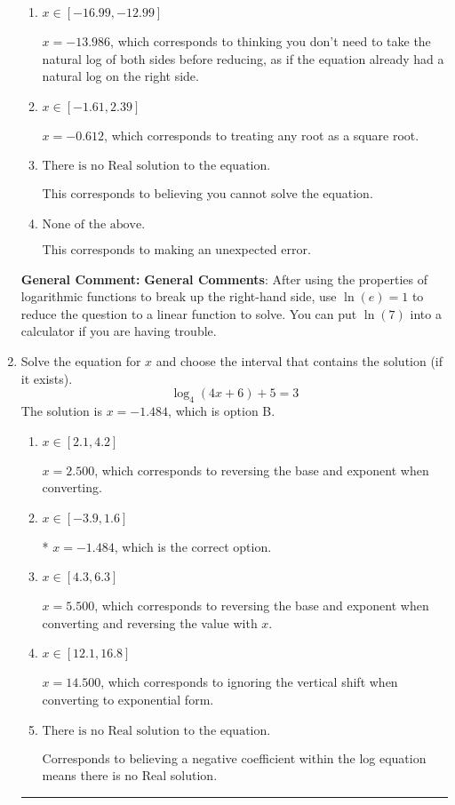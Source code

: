 \documentclass{extbook}[14pt]
\newcommand{\litem}[1]{\item #1

\rule{\textwidth}{0.4pt}}
\begin{document}
\begin{enumerate}
{\begin{enumerate}[label=\Alph*.]
* $x = -2.809$, which is the correct option.
\item \( x \in [-16.99, -12.99] \)

$x = -13.986$, which corresponds to thinking you don't need to take the natural log of both sides before reducing, as if the equation already had a natural log on the right side.
\item \( x \in [-1.61, 2.39] \)

$x = -0.612$, which corresponds to treating any root as a square root.
\item \( \text{There is no Real solution to the equation.} \)

This corresponds to believing you cannot solve the equation.
\item \( \text{None of the above.} \)

This corresponds to making an unexpected error.
\end{enumerate}

\textbf{General Comment:} \textbf{General Comments}: After using the properties of logarithmic functions to break up the right-hand side, use $\ln(e) = 1$ to reduce the question to a linear function to solve. You can put $\ln(7)$ into a calculator if you are having trouble.
}
\litem{
Solve the equation for $x$ and choose the interval that contains the solution (if it exists).
\[ \log_{4}{(4x+6)}+5 = 3 \]
The solution is \( x = -1.484 \), which is option B.\begin{enumerate}[label=\Alph*.]
\item \( x \in [2.1, 4.2] \)

$x = 2.500$, which corresponds to reversing the base and exponent when converting.
\item \( x \in [-3.9, 1.6] \)

* $x = -1.484$, which is the correct option.
\item \( x \in [4.3, 6.3] \)

$x = 5.500$, which corresponds to reversing the base and exponent when converting and reversing the value with $x$.
\item \( x \in [12.1, 16.8] \)

$x = 14.500$, which corresponds to ignoring the vertical shift when converting to exponential form.
\item \( \text{There is no Real solution to the equation.} \)

Corresponds to believing a negative coefficient within the log equation means there is no Real solution.
\end{enumerate}

}
\end{enumerate}
\end{document}

